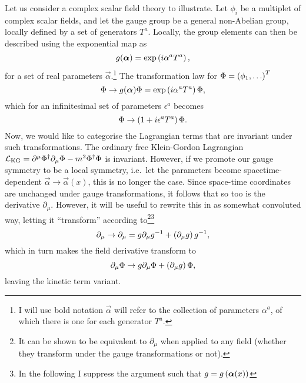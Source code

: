 \documentclass[../main.tex]{subfiles}
\begin{document}
Let us consider a complex scalar field theory to illustrate. Let \(\phi_i\) be
a multiplet of complex scalar fields, and let the gauge group be a general
non-Abelian group, locally defined by a set of generators \(T^a\). Locally, the
group elements can then be described using the exponential map as\needcite\
\begin{equation}
  g(\boldsymbol{\alpha}) = \operatorname{exp}\left(i \alpha^a T^a\right),
\end{equation}
for a set of real parameters \(\vec{\alpha}\).\footnote{I will use bold
  notation \(\vec\alpha\) will refer to the collection of parameters
  \(\alpha^a\), of which there is one for each generator \(T^a\).}
The transformation law for \(\Phi = \left(\phi_1, \ldots\right)^T\)
\begin{equation}
  \label{qft:eq:gauge_transformation}
  \Phi \to g(\boldsymbol{\alpha}) \Phi = \operatorname{exp}\left(i \alpha^a T^a\right) \Phi,
\end{equation}
which for an infinitesimal set of parameters \(\epsilon^a\) becomes
\begin{equation}
  \Phi \to \left(1 + i \epsilon^a T^a\right) \Phi.
\end{equation}
\medskip
Now, we would like to categorise the Lagrangian terms that are invariant under
such transformations.
The ordinary free Klein-Gordon Lagrangian \(\mathcal{L}_\text{KG} = \partial^\mu
\Phi^\dagger \partial_\mu \Phi - m^2 \Phi^\dagger \Phi\) is invariant.
However, if we promote our gauge symmetry to be a local symmetry, i.e.\ let the
parameters become spacetime-dependent \(\vec{\alpha} \to \vec{\alpha}(x)\),
this is no longer the case.
Since space-time coordinates are unchanged under gauge transformations, it
follows that so too is the derivative \(\partial_\mu\).
However, it will be useful to rewrite this in as somewhat convoluted way,
letting it ``transform'' according to\footnote{It can be shown to be equivalent
  to \(\partial_\mu\) when applied to any field (whether they transform under
  the
  gauge transformations or not).}\footnote{In the following I suppress the
  argument such that \(g = g\left(\boldsymbol{\alpha}(x)\right)\)}
\begin{equation}
  \partial_\mu \to \partial_\mu = g \partial_\mu g^{-1} +
  \left(\partial_\mu g\right) g^{-1},
\end{equation}
which in turn makes the field derivative transform to
\begin{equation}
  \partial_\mu \Phi \to g \partial_\mu \Phi + \left(\partial_\mu g\right) \Phi,
\end{equation}
leaving the kinetic term variant.
\end{document}
